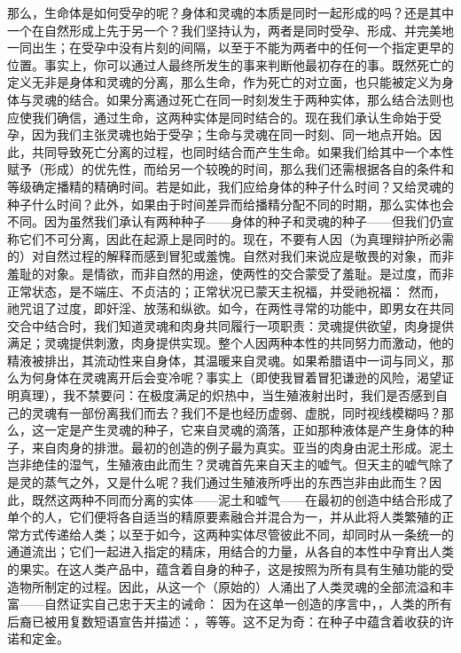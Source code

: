 那么，生命体是如何受孕的呢？身体和灵魂的本质是同时一起形成的吗？还是其中一个在自然形成上先于另一个？我们坚持认为，两者是同时受孕、形成、并完美地一同出生；在受孕中没有片刻的间隔，以至于不能为两者中的任何一个指定更早的位置。事实上，你可以通过人最终所发生的事来判断他最初存在的事。既然死亡的定义无非是身体和灵魂的分离，那么生命，作为死亡的对立面，也只能被定义为身体与灵魂的结合。如果分离通过死亡在同一时刻发生于两种实体，那么结合法则也应使我们确信，通过生命，这两种实体是同时结合的。现在我们承认生命始于受孕，因为我们主张灵魂也始于受孕；生命与灵魂在同一时刻、同一地点开始。因此，共同导致死亡分离的过程，也同时结合而产生生命。如果我们给其中一个本性赋予（形成）的优先性，而给另一个较晚的时间，那么我们还需根据各自的条件和等级确定播精的精确时间。若是如此，我们应给身体的种子什么时间？又给灵魂的种子什么时间？此外，如果由于时间差异而给播精分配不同的时期，那么实体也会不同。因为虽然我们承认有两种种子——身体的种子和灵魂的种子——但我们仍宣称它们不可分离，因此在起源上是同时的。现在，不要有人因（为真理辩护所必需的）对自然过程的解释而感到冒犯或羞愧。自然对我们来说应是敬畏的对象，而非羞耻的对象。是情欲，而非自然的用途，使两性的交合蒙受了羞耻。是过度，而非正常状态，是不端庄、不贞洁的；正常状况已蒙天主祝福，并受祂祝福： 然而，祂咒诅了过度，即奸淫、放荡和纵欲。如今，在两性寻常的功能中，即男女在共同交合中结合时，我们知道灵魂和肉身共同履行一项职责：灵魂提供欲望，肉身提供满足；灵魂提供刺激，肉身提供实现。整个人因两种本性的共同努力而激动，他的精液被排出，其流动性来自身体，其温暖来自灵魂。如果希腊语中一词与同义，那么为何身体在灵魂离开后会变冷呢？事实上（即使我冒着冒犯谦逊的风险，渴望证明真理），我不禁要问：在极度满足的炽热中，当生殖液射出时，我们是否感到自己的灵魂有一部份离我们而去？我们不是也经历虚弱、虚脱，同时视线模糊吗？那么，这一定是产生灵魂的种子，它来自灵魂的滴落，正如那种液体是产生身体的种子，来自肉身的排泄。最初的创造的例子最为真实。亚当的肉身由泥土形成。泥土岂非绝佳的湿气，生殖液由此而生？灵魂首先来自天主的嘘气。但天主的嘘气除了是灵的蒸气之外，又是什么呢？我们通过生殖液所呼出的东西岂非由此而生？因此，既然这两种不同而分离的实体——泥土和嘘气——在最初的创造中结合形成了单个的人，它们便将各自适当的精原要素融合并混合为一，并从此将人类繁殖的正常方式传递给人类；以至于如今，这两种实体尽管彼此不同，却同时从一条统一的通道流出；它们一起进入指定的精床，用结合的力量，从各自的本性中孕育出人类的果实。在这人类产品中，蕴含着自身的种子，这是按照为所有具有生殖功能的受造物所制定的过程。因此，从这一个（原始的）人涌出了人类灵魂的全部流溢和丰富——自然证实自己忠于天主的诫命： 因为在这单一创造的序言中，，人类的所有后裔已被用复数短语宣告并描述：，等等。这不足为奇：在种子中蕴含着收获的许诺和定金。\par

